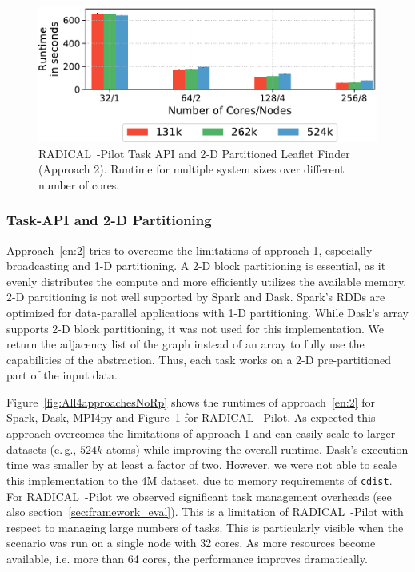 

\begin{figure}[t]
    \centering
    \includegraphics[width=.75\textwidth]{figures/data_analytics_hpc/task_par/rpLF.pdf}
    \caption{RADICAL~-Pilot Task API and 2-D Partitioned Leaflet Finder (Approach 2).
    Runtime for multiple system sizes over different number of cores.}
    \label{fig:rpLF}
\end{figure}

\subsubsection*{Task-API and 2-D Partitioning}
Approach~\ref{en:2} tries to overcome the limitations of approach 1, especially broadcasting and 1-D partitioning.
A 2-D block partitioning is essential, as it evenly distributes the compute and more efficiently utilizes the available memory.
2-D partitioning is not well supported by Spark and Dask.
Spark's RDDs are optimized for data-parallel applications with 1-D partitioning.
While Dask's array supports 2-D block partitioning, it was not used for this implementation.
We return the adjacency list of the graph instead of an array to fully use the capabilities of the abstraction.
Thus, each task works on a 2-D pre-partitioned part of the input data.

Figure~\ref{fig:All4approachesNoRp} shows the runtimes of approach~\ref{en:2} for Spark, Dask, MPI4py and Figure~\ref{fig:rpLF} for RADICAL~-Pilot.
As expected this approach overcomes the limitations of approach 1 and can easily scale to larger datasets (e.\,g., $524k$ atoms) while improving the overall runtime.
Dask's execution time was smaller by at least a factor of two.
However, we were not able to scale this implementation to the 4M dataset, due to memory requirements of \texttt{cdist}.
For RADICAL~-Pilot we observed significant task management overheads (see also section~\ref{sec:framework_eval}).
This is a limitation of RADICAL~-Pilot with respect to managing large numbers of tasks.
This is particularly visible when the scenario was run on a single node with 32 cores.
As more resources become available, i.e. more than 64 cores, the performance improves dramatically.


